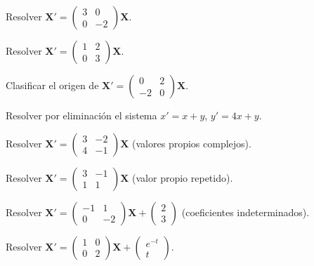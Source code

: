 \begin{prob}
Resolver $\mathbf{X}'=\begin{pmatrix}3&0\\0&-2\end{pmatrix}\mathbf{X}$.
\end{prob}

\begin{prob}
Resolver $\mathbf{X}'=\begin{pmatrix}1&2\\0&3\end{pmatrix}\mathbf{X}$.
\end{prob}

\begin{prob}
Clasificar el origen de $\mathbf{X}'=\begin{pmatrix}0&2\\-2&0\end{pmatrix}\mathbf{X}$.
\end{prob}

\begin{prob}
Resolver por eliminación el sistema $x'=x+y$, $y'=4x+y$.
\end{prob}

\begin{prob}
Resolver $\mathbf{X}'=\begin{pmatrix}3&-2\\4&-1\end{pmatrix}\mathbf{X}$ (valores propios complejos).
\end{prob}

\begin{prob}
Resolver $\mathbf{X}'=\begin{pmatrix}3&-1\\1&1\end{pmatrix}\mathbf{X}$ (valor propio repetido).
\end{prob}

\begin{prob}
Resolver $\mathbf{X}'=\begin{pmatrix}-1&1\\0&-2\end{pmatrix}\mathbf{X}+\begin{pmatrix}2\\3\end{pmatrix}$ (coeficientes indeterminados).
\end{prob}

\begin{prob}
Resolver $\mathbf{X}'=\begin{pmatrix}1&0\\0&2\end{pmatrix}\mathbf{X}+\begin{pmatrix}e^{-t}\\ t\end{pmatrix}$.
\end{prob}

